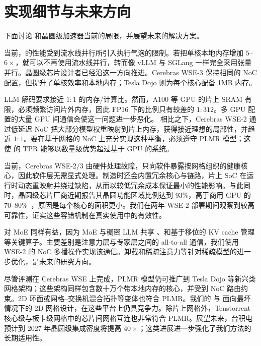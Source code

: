\vspace{-0.3cm}
\section{实现细节与未来方向}

下面讨论 \sys 和晶圆级加速器当前的局限，并展望未来的解决方案。

 当前，\sys 的性能受到流水线并行所引入执行气泡的限制。若把单核本地内存增加 $5$--$6\times$，就可以不再使用流水线并行，转而像 vLLM 与 SGLang 一样完全采用张量并行。晶圆级芯片设计者已经沿这一方向推进。Cerebras WSE-3 保持相同的 NoC 配置，但提升了单核效率和本地内存；Tesla Dojo 则为每个核心配备 1MB 内存。

 LLM 解码要求接近 $1{:}1$ 的内存/计算比。然而，A100 等 GPU 的片上 SRAM 有限，必须频繁访问片外内存，因此 FP16 下的比例只有较差的 $1{:}312$。多 GPU 配置的大量 GPU 间通信会使这一问题进一步恶化。
相比之下，Cerebras WSE-2 通过低延迟 NoC 把大部分模型权重映射到片上内存，获得接近理想的局部性，并趋近 $1{:}1$。要在基于网格的 NoC 上充分实现这种平衡，必须遵守 PLMR 模型；这使 \sys 的 TPR 能够以数量级优势超过基于 GPU 的系统。

 当前，Cerebras WSE-2/3 由硬件处理故障，只向软件暴露按网格组织的健康核心，因此软件层无需显式处理。制造时还会内置冗余核心与链路，片上 SoC 在运行时动态重映射并绕过缺陷，从而以较低冗余成本保证最小的性能影响。与此同时，晶圆级芯片厂商近期报告其晶圆功能区域比例达到 93\%，高于商用 GPU 的 70--80\%~\cite{cerebras_defect_tolerance}，原因是每个核心的面积更小。我们在两年 WSE-2 部署期间观察到较高可靠性，证实这些容错机制在真实使用中的有效性。

 \sys 对 MoE 同样有益，因为 MoE 与稠密 LLM 共享 \gemm、\gemv 和基于移位的 KV cache 管理等关键算子。主要差别是注意力层与专家层之间的 all-to-all 通信，我们使用 WSE-2 的 NoC 多播操作实现该通信。卸载和稀疏注意力等针对稀疏模型的进一步优化，是未来的研究方向。

 尽管评测在 Cerebras WSE 上完成，PLMR 模型仍可推广到 Tesla Dojo 等新兴类网格架构；这些架构同样包含数十万个带本地内存的核心，并受到 NoC 路由约束。2D 环面或网格--交换机混合拓扑等变体也符合 PLMR。我们的 \gemm 与 \gemv 面向最坏情况下的 2D 网格设计，在这些平台上仍具竞争力。除片上网格外，Tenstorrent 核心级与板卡级网格中的芯片间网格互连也非常符合 PLMR。展望未来，台积电预计到 2027 年晶圆级集成密度将提高 $40\times$；这类进展进一步强化了我们方法的长期适用性。

\vspace{-0.2cm}
